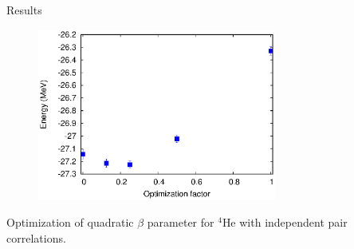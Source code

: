 \documentclass{beamer}
\begin{document}
\begin{frame}{Results}
\begin{figure}[h]
   \centering
   \includegraphics[width=0.7\textwidth]{figures/quadfact.eps}
\end{figure}
Optimization of quadratic $\beta$ parameter for $^{4}$He with independent pair correlations.
\end{frame}
\end{document}
